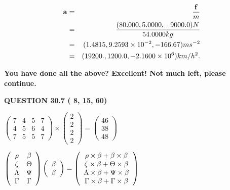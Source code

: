 \documentclass[12pt]{article}
\begin{document}
\begin{eqnarray*}
\mathbf{a}&=&\frac{\mathbf{f}}m  \\
&=&\frac{(
80.000 ,
5.0000 ,
-9000.0 )N
}{ %
54.0000 kg}  \\
&=&(
1.4815 ,
9.2593 \times 10^{-2},
-166.67
)ms^{-2} \\
&=&(
19200. ,
1200.0 ,
-2.1600 \times 10^{6}
)km/h^2.
\end{eqnarray*}
 
 
 
   
   
\vspace{0.3in}
{\textbf{\LARGE{You have done all the above? Excellent! Not much left, please continue.}}}
\vspace{0.3in}
   
   
  
\vspace{0.2in}
  
{\textbf{\Large{QUESTION
30.7 
 (          8,         15,         60)
}}}
  
  
 
 
\noindent{}

 
$\left( \begin{array}{ccccccccccccccc}
           7 & 
           4 & 
           5 & 
           7 \\ 
           4 & 
           5 & 
           6 & 
           4 \\ 
           7 & 
           5 & 
           5 & 
           7
\end{array}\right) \times
\left( \begin{array}{c}
           2 \\ 
           2 \\ 
           2 \\ 
           2
\end{array}\right)  =
\left( \begin{array}{c}
          46 \\ 
          38 \\ 
          48
\end{array}\right)  $
 
$  %
 \left( \begin{array}
 {
 c
 c
 }
 \rho & 
 \beta \\ 
                    \zeta & 
 \Theta \\ 
 \Lambda & 
 \Psi \\ 
 \Gamma & 
 \Gamma
 \end{array} \right)
 \left( \begin{array}
 {
 c
 }
 \beta \\ 
 \beta
 \end{array} \right)
=
  \left( \begin{array}
 {
 c
 }
 \rho \times  \beta   +  \beta \times  \beta \\ 
                    \zeta \times  \beta   +  \Theta \times  \beta \\ 
 \Lambda \times  \beta   +  \Psi \times  \beta \\ 
 \Gamma \times  \beta   +  \Gamma \times  \beta
 \end{array} \right)
$
 
\end{document}
